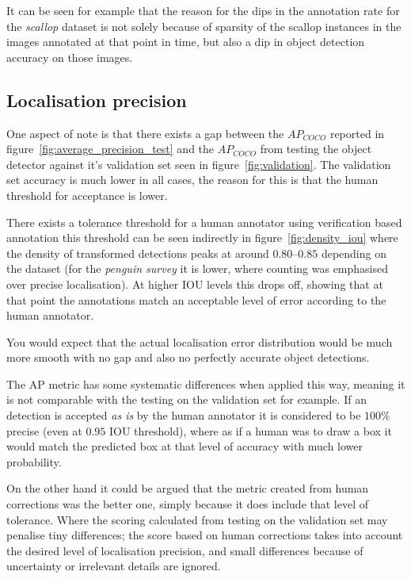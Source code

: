 It can be seen for example that the reason for the dips in the annotation rate for the \emph{scallop} dataset is not solely because of sparsity of the scallop instances in the images annotated at that point in time, but also a dip in object detection accuracy on those images.


\subsection{Localisation precision}
\label{sec:localisation_precision}


One aspect of note is that there exists a gap between the $AP_{COCO}$ reported in figure~\ref{fig:average_precision_test} and the $AP_{COCO}$ from testing the object detector against it's validation set seen in figure~\ref{fig:validation}. The validation set accuracy is much lower in all cases, the reason for this is that the human threshold for acceptance is lower. 

There exists a tolerance threshold for a human annotator using verification based annotation this threshold can be seen indirectly in figure~\ref{fig:density_iou} where the density of transformed detections peaks at around $0.80$--$0.85$ depending on the dataset (for the \emph{penguin survey} it is lower, where counting was emphasised over precise localisation). At higher \gls{IOU} levels this drops off, showing that at that point the annotations match an acceptable level of error according to the human annotator. 

You would expect that the actual localisation error distribution would be much more smooth with no gap and also no perfectly accurate object detections.
 
The \gls{AP} metric has some systematic differences when applied this way, meaning it is not comparable with the testing on the validation set for example. If an detection is accepted \emph{as is} by the human annotator it is considered to be $100\%$ precise (even at $0.95$ \gls{IOU} threshold), where as if a human was to draw a box it would match the predicted box at that level of accuracy with much lower probability. 

On the other hand it could be argued that the metric created from human corrections was the better one, simply because it does include that level of tolerance. Where the scoring calculated from testing on the validation set may penalise tiny differences; the score based on human corrections takes into account the desired level of localisation precision, and small differences because of uncertainty or irrelevant details are ignored.


